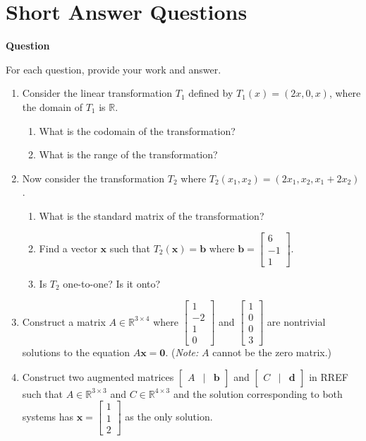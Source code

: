 \documentclass[10pt, titlepage]{article}
\newcounter{question}
\newenvironment{newquestion}
{
	\noindent\textbf{Question \thequestion}
}
{
\stepcounter{question}
\par
}
\renewcommand{\vec}[1]{\bm{#1}}
\begin{document}
\section{\centering Short Answer Questions}
\begin{newquestion}
	For each question, provide your work and answer.
	\begin{enumerate}
		\item Consider the linear transformation \(T_1\) defined by \(T_1(x) = (2x, 0, x)\), where the domain of \(T_1\) is \(\mathbb{R}\).
			\begin{enumerate}
				\item What is the codomain of the transformation?
				\item What is the range of the transformation?
			\end{enumerate}

		\item Now consider the transformation \(T_2\) where \(T_2(x_1, x_2) = (2x_1, x_2, x_1 + 2x_2)\).
			\begin{enumerate}
				\item What is the standard matrix of the transformation?
				\item Find a vector \(\vec{x}\) such that \(T_2(\vec{x}) = \vec{b}\) where \(\vec{b} = \begin{bmatrix}6 \\ -1 \\ 1\end{bmatrix}\).
				\item Is \(T_2\) one-to-one? Is it onto?
			\end{enumerate}

		\item Construct a matrix \(A \in \mathbb{R}^{3 \times 4}\) where \(\begin{bmatrix}1 \\ -2 \\ 1 \\ 0\end{bmatrix}\) and 
			\(\begin{bmatrix}1 \\ 0 \\ 0 \\ 3\end{bmatrix}\) are nontrivial solutions to the equation \(A\vec{x} = \vec{0}\). (\textit{Note:} \(A\) cannot be 
			the zero matrix.)
			
		\item Construct two augmented matrices \(\begin{bmatrix}A & | & \vec{b}\end{bmatrix}\) and \(\begin{bmatrix}C & | & \vec{d}\end{bmatrix}\)
			in RREF such that \(A \in \mathbb{R}^{3 \times 3}\) and \(C \in \mathbb{R}^{4 \times 3}\) and the solution corresponding to both systems has
			\(\vec{x} = \begin{bmatrix}1 \\ 1 \\ 2\end{bmatrix}\) as the only solution.


\end{enumerate}
\end{newquestion}
\end{document}
